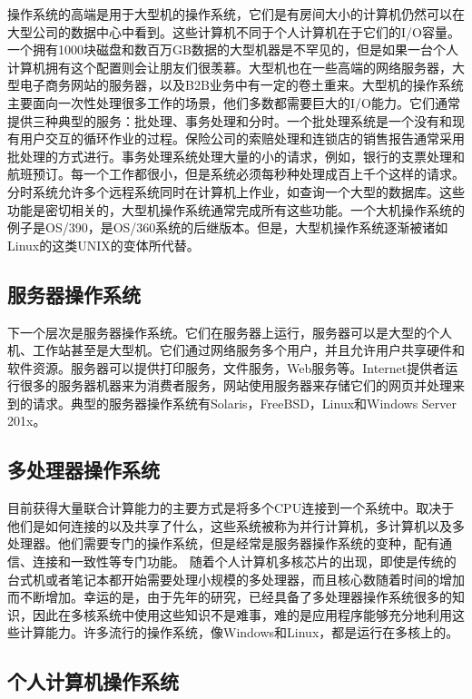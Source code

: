 	操作系统的高端是用于大型机的操作系统，它们是有房间大小的计算机仍然可以在大型公司的数据中心中看到。这些计算机不同于个人计算机在于它们的I/O容量。一个拥有1000块磁盘和数百万GB数据的大型机器是不罕见的，但是如果一台个人计算机拥有这个配置则会让朋友们很羡慕。大型机也在一些高端的网络服务器，大型电子商务网站的服务器，以及B2B业务中有一定的卷土重来。大型机的操作系统主要面向一次性处理很多工作的场景，他们多数都需要巨大的I/O能力。它们通常提供三种典型的服务：批处理、事务处理和分时。一个批处理系统是一个没有和现有用户交互的循环作业的过程。保险公司的索赔处理和连锁店的销售报告通常采用批处理的方式进行。事务处理系统处理大量的小的请求，例如，银行的支票处理和航班预订。每一个工作都很小，但是系统必须每秒种处理成百上千个这样的请求。分时系统允许多个远程系统同时在计算机上作业，如查询一个大型的数据库。这些功能是密切相关的，大型机操作系统通常完成所有这些功能。一个大机操作系统的例子是OS/390，是OS/360系统的后继版本。但是，大型机操作系统逐渐被诸如Linux的这类UNIX的变体所代替。
	
	\subsection{服务器操作系统}
	
	下一个层次是服务器操作系统。它们在服务器上运行，服务器可以是大型的个人机、工作站甚至是大型机。它们通过网络服务多个用户，并且允许用户共享硬件和软件资源。服务器可以提供打印服务，文件服务，Web服务等。Internet提供者运行很多的服务器机器来为消费者服务，网站使用服务器来存储它们的网页并处理来到的请求。典型的服务器操作系统有Solaris，FreeBSD，Linux和Windows Server 201x。
	
	\subsection{多处理器操作系统}
	
	目前获得大量联合计算能力的主要方式是将多个CPU连接到一个系统中。取决于他们是如何连接的以及共享了什么，这些系统被称为并行计算机，多计算机以及多处理器。他们需要专门的操作系统，但是经常是服务器操作系统的变种，配有通信、连接和一致性等专门功能。
	随着个人计算机多核芯片的出现，即使是传统的台式机或者笔记本都开始需要处理小规模的多处理器，而且核心数随着时间的增加而不断增加。幸运的是，由于先年的研究，已经具备了多处理器操作系统很多的知识，因此在多核系统中使用这些知识不是难事，难的是应用程序能够充分地利用这些计算能力。许多流行的操作系统，像Windows和Linux，都是运行在多核上的。
	
	\subsection{个人计算机操作系统}
	
